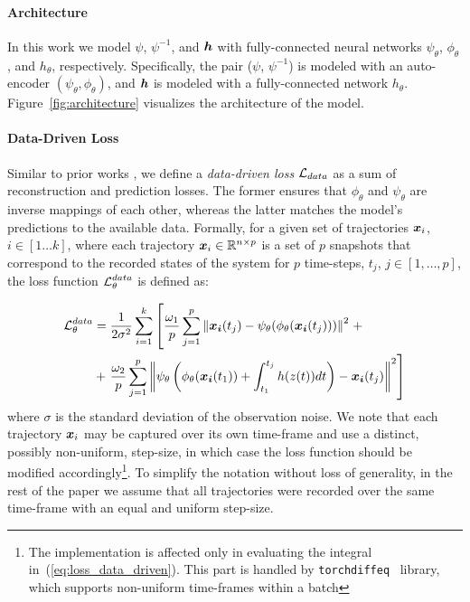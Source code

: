 \paragraph{Architecture} In this work we model $\psi$, $\psi^{-1}$, and $\boldsymbol{h}$ with fully-connected neural networks $\psi_\theta$, $\phi_\theta$, and $h_\theta$, respectively. Specifically, the pair ($\psi$, $\psi^{-1}$) is modeled with an auto-encoder $(\psi_\theta, \phi_\theta)$, and $\boldsymbol{h}$ is modeled with a fully-connected network $h_\theta$. Figure~\ref{fig:architecture} visualizes the architecture of the model. 

\paragraph{Data-Driven Loss} Similar to prior works \cite{takeishi2017learning,morton2019deep,gin2021deep}, we define a \textit{data-driven loss} $\operatorname{\mathcal{L}}_{data}$ as a sum of reconstruction and prediction losses. The former ensures that $\phi_\theta$ and $\psi_\theta$ are inverse mappings of each other, whereas the latter matches the model's predictions to the available data. Formally, for a given set of trajectories $\boldsymbol{x}_i$, $i \in [1 \dots k]$, where each trajectory $\boldsymbol{x}_i \in \mathbb{R}^{n \times p}$ is a set of $p$ snapshots that correspond to the recorded states of the system for $p$ time-steps, $t_j$, $j \in [1, \dots, p]$, the loss function $\operatorname{\mathcal{L}}^{data}_\theta$ is defined as:

\begin{align}
    \label{eq:loss_data_driven}
    \operatorname{\mathcal{L}}^{data}_\theta & = \frac{1}{2\sigma^2}\sum_{i = 1}^k \left[\frac{\omega_1}{p}\sum_{j=1}^p\left\|\boldsymbol{x_i}(t_j) - \psi_\theta(\phi_\theta(\boldsymbol{x_i}(t_j)))\right\|^2\right. + \\
     & + \left.\frac{\omega_2}{p}\sum_{j=1}^p \left\|\psi_\theta\left(\phi_\theta(\boldsymbol{x_i}(t_1)) + \int_{t_1}^{t_j}h(z(t))dt\right) - \boldsymbol{x_i}(t_j)\right\|^2 \right]
\end{align}
where $\sigma$ is the standard deviation of the observation noise. We note that each trajectory $\boldsymbol{x}_i$ may be captured over its own time-frame and use a distinct, possibly non-uniform, step-size, in which case the loss function should be modified accordingly\footnote{The implementation is affected only in evaluating the integral in~(\ref{eq:loss_data_driven}). This part is handled by \texttt{torchdiffeq}~\cite{chen2018neural} library, which supports non-uniform time-frames within a batch}. To simplify the notation without loss of generality, in the rest of the paper we assume that all trajectories were recorded over the same time-frame with an equal and uniform step-size. 

